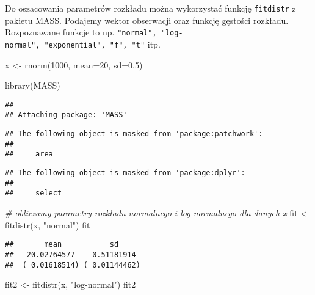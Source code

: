 \documentclass[
]{book}
\newenvironment{Shaded}{\begin{snugshade}}{\end{snugshade}}
\newcommand{\AttributeTok}[1]{\textcolor[rgb]{0.77,0.63,0.00}{#1}}
\newcommand{\CommentTok}[1]{\textcolor[rgb]{0.56,0.35,0.01}{\textit{#1}}}
\newcommand{\DecValTok}[1]{\textcolor[rgb]{0.00,0.00,0.81}{#1}}
\newcommand{\FloatTok}[1]{\textcolor[rgb]{0.00,0.00,0.81}{#1}}
\newcommand{\FunctionTok}[1]{\textcolor[rgb]{0.00,0.00,0.00}{#1}}
\newcommand{\NormalTok}[1]{#1}
\newcommand{\OtherTok}[1]{\textcolor[rgb]{0.56,0.35,0.01}{#1}}
\newcommand{\StringTok}[1]{\textcolor[rgb]{0.31,0.60,0.02}{#1}}
\begin{document}
Do oszacowania parametrów rozkładu można wykorzystać funkcję \texttt{fitdistr} z pakietu MASS. Podajemy wektor obserwacji oraz funkcję gęstości rozkładu. Rozpoznawane funkcje to np. \texttt{"normal",\ "log-normal",\ "exponential",\ "f",\ "t"} itp.

\begin{Shaded}
\begin{Highlighting}[]
\NormalTok{x }\OtherTok{\textless{}{-}} \FunctionTok{rnorm}\NormalTok{(}\DecValTok{1000}\NormalTok{, }\AttributeTok{mean=}\DecValTok{20}\NormalTok{, }\AttributeTok{sd=}\FloatTok{0.5}\NormalTok{)}

\FunctionTok{library}\NormalTok{(MASS)}
\end{Highlighting}
\end{Shaded}

\begin{verbatim}
## 
## Attaching package: 'MASS'
\end{verbatim}

\begin{verbatim}
## The following object is masked from 'package:patchwork':
## 
##     area
\end{verbatim}

\begin{verbatim}
## The following object is masked from 'package:dplyr':
## 
##     select
\end{verbatim}

\begin{Shaded}
\begin{Highlighting}[]
\CommentTok{\# obliczamy parametry rozkładu normalnego i log{-}normalnego dla danych x}
\NormalTok{fit }\OtherTok{\textless{}{-}} \FunctionTok{fitdistr}\NormalTok{(x, }\StringTok{"normal"}\NormalTok{)}
\NormalTok{fit}
\end{Highlighting}
\end{Shaded}

\begin{verbatim}
##       mean           sd     
##   20.02764577    0.51181914 
##  ( 0.01618514) ( 0.01144462)
\end{verbatim}

\begin{Shaded}
\begin{Highlighting}[]
\NormalTok{fit2 }\OtherTok{\textless{}{-}} \FunctionTok{fitdistr}\NormalTok{(x, }\StringTok{"log{-}normal"}\NormalTok{)}
\NormalTok{fit2}
\end{Highlighting}
\end{Shaded}
\end{document}
